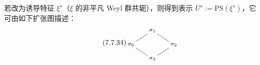若改为诱导特征 $\xi^s$（$\xi$ 的非平凡 Weyl 群共轭），则得到表示 $U^s:=\mathrm{PS}(\xi^s)$，它可由如下扩张图描述：
\begin{equation}\tag{7.7.34}\label{eq:a4-7-7-34}
\begin{tikzpicture}[baseline=(current bounding box.center),every node/.style={font=\footnotesize, inner sep=2pt}]
\node (t) at (0,1.4) {$\sigma_1$};
\node (l) at (-1.05,0.7) {$\sigma_0$};
\node (r) at (1.05,0.7) {$\sigma_2$};
\node (b) at (0,0) {$\sigma_3$};
\draw (t)--(l); \draw (t)--(r); \draw (l)--(b); \draw (r)--(b);
\end{tikzpicture}
\end{equation}


